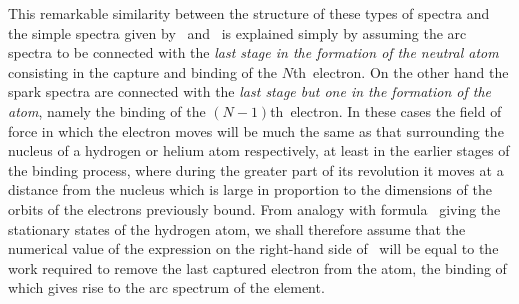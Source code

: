 This remarkable similarity between the structure of these types
of spectra and the simple spectra given by ~and~ is explained
simply by assuming the arc spectra to be connected with the \emph{last
stage in the formation of the neutral atom} consisting in the capture
and binding of the $N$th~electron. On the other hand the spark
spectra are connected with the \emph{last stage but one in the formation
of the atom}, namely the binding of the $(N - 1)$th~electron. In these
cases the field of force in which the electron moves will be much
the same as that surrounding the nucleus of a hydrogen or helium
atom respectively, at least in the earlier stages of the binding
process, where during the greater part of its revolution it moves
at a distance from the nucleus which is large in proportion to the
dimensions of the orbits of the electrons previously bound. From
analogy with formula~ giving the stationary states of the
hydrogen atom, we shall therefore assume that the numerical value
of the expression on the right-hand side of~ will be equal to the
work required to remove the last captured electron from the atom,
the binding of which gives rise to the arc spectrum of the element.

